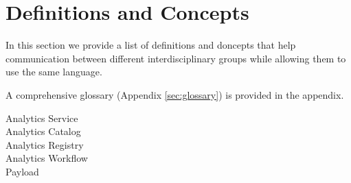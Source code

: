 
\section{Definitions and Concepts}
\label{sec:definitions}

In this section we provide a list of definitions and doncepts that
help communication between different interdisciplinary groups while
allowing them to use the same language.

A comprehensive glossary (Appendix \ref{sec:glossary}) is provided in the appendix. 

\begin{description}

\item[Analytics Service] 

\item[Analytics Catalog]

\item[Analytics Registry]

\item[Analytics Workflow]

\item[Payload]


\end{description}

